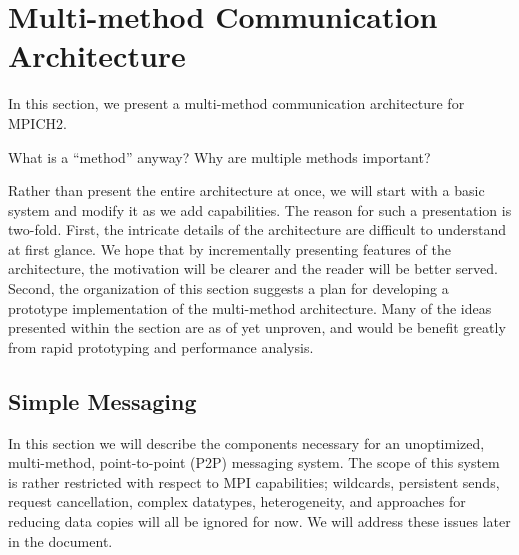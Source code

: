 
\section{Multi-method Communication Architecture}

In this section, we present a multi-method communication architecture
for MPICH2.

What is a ``method'' anyway?  Why are multiple methods important?

Rather than present the entire architecture at once, we will start
with a basic system and modify it as we add capabilities.  The reason
for such a presentation is two-fold.  First, the intricate details of
the architecture are difficult to understand at first glance.  We hope
that by incrementally presenting features of the architecture, the
motivation will be clearer and the reader will be better served.
Second, the organization of this section suggests a plan for
developing a prototype implementation of the multi-method
architecture.  Many of the ideas presented within the section are as
of yet unproven, and would be benefit greatly from rapid prototyping
and performance analysis.




\subsection{Simple Messaging}

% 
% 

In this section we will describe the components necessary for an unoptimized,
multi-method, point-to-point (P2P) messaging system.  The scope of this system
is rather restricted with respect to MPI capabilities; wildcards, persistent
sends, request cancellation, complex datatypes, heterogeneity, and approaches
for reducing data copies will all be ignored for now.  We will address these
issues later in the document.

